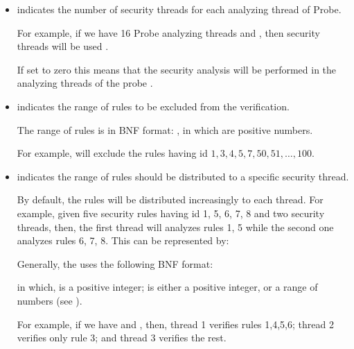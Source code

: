 \begin{itemize}
   \item {} indicates the number of security threads for each analyzing thread of Probe.
   
   For example, if we have 16 Probe analyzing threads and ,
   then  security threads will be used .

   If set to zero this means that the security analysis will be performed in the analyzing threads of the probe .

    
   \item {} indicates the range of rules to be excluded from the verification.
   
   The range of rules is in BNF format:  , in which  are positive numbers.
   
   
   For example,  will exclude the rules having id $1,3,4,5,7,50, 51, \ldots, 100$.
   
   
   
   \item {} indicates  the range of rules should be distributed to a specific security thread.
    
   By default, the rules will be distributed increasingly to each thread. 
   For example, given five security rules having id 1, 5, 6, 7, 8 and two security threads, then,
   the first thread will analyzes rules 1, 5 while the second one analyzes rules 6, 7, 8.
   This can be represented by:
   
   \begin{center}
   \end{center}  
  
   Generally, the  uses the following BNF format: 
   \begin{center}
   \end{center}
   
   in which,  is  a positive integer;
        is either a positive integer, or a range of numbers (see ).
   
   For example,  if we have  and
      ,
    then, 
      thread 1 verifies rules 1,4,5,6;  
      thread 2 verifies only rule 3; 
      and 
      thread 3 verifies the rest.
   

\end{itemize}
